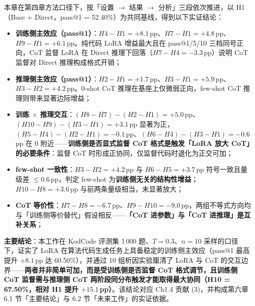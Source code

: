 
本章在第四章方法口径下，按「设置 $\to$ 结果 $\to$ 分析」三段依次推进，以 H1（Base + Direct，pass@1 = 52.40\%）为共同基线，得到以下实证结论：
\begin{itemize}
    \item \textbf{训练侧主效应（pass@1）}：$H4-H1 = +8.1$\,pp、$H7-H1 = +4.8$\,pp、$H9-H1 = +6.1$\,pp。纯代码 LoRA 增益最大且在 pass@1/5/10 三档同号正向，CoT 监督 LoRA 在 Direct 推理下回落（$H7-H4 = -3.3$\,pp）说明 CoT 监督对 Direct 推理构成格式开销；
    \item \textbf{推理侧主效应（pass@1）}：$H2-H1 = +1.7$\,pp、$H3-H1 = +5.9$\,pp、$H3-H2 = +4.2$\,pp。0-shot CoT 推理在基座上仅微弱正向，few-shot CoT 推理则带来显著边际增益；
    \item \textbf{训练 $\times$ 推理交互}：$(H8-H7)-(H2-H1) = +5.0$\,pp、$(H10-H9)-(H3-H1) = +3.1$\,pp 显著为正，$(H5-H4)-(H2-H1) = -0.1$\,pp、$(H6-H4)-(H3-H1) = -0.6$\,pp 在 0 附近——\textbf{训练侧是否显式监督 CoT 格式是触发「LoRA 放大 CoT」的必要条件}：监督 CoT 时形成正协同，仅监督代码时退化为正交可加；
    \item \textbf{few-shot 一致性}：$H3-H2 = +4.2$\,pp 与 $H6-H5 = +3.7$\,pp 符号一致且量级差 $\le 0.6$\,pp，判定 few-shot 为\textbf{训练侧无关的结构性增益}；$H10-H8 = +3.6$\,pp 与前两条量级相当，未显著放大；
    \item \textbf{CoT 等价性}：$H7-H8 = -6.7$\,pp、$H9-H10 = -9.0$\,pp，两组不等式方向均与「训练侧等价替代」假设相反——\textbf{「CoT 进参数」与「CoT 进推理」是互补关系}；
\end{itemize}

\textbf{主要结论}：本工作在 KodCode 评测集 1\,000 题、$T=0.3$、$n=10$ 采样的口径下，证实了 LoRA 在算法代码生成任务上具备稳定的训练侧主效应（pass@1 最高提升 $+8.1$\,pp 达 60.50\%），并通过 10 组析因实验厘清了 LoRA 与 CoT 的交互边界——\textbf{两者并非简单可加，而是受训练侧是否监督 CoT 格式调节，且训练侧 CoT 监督需与推理侧 CoT 两阶段同分布触发才能取得最大协同（H10 = 67.50\%，相对 H1 提升 $+15.1$\,pp）}。该结论对应 Ch1.4 贡献 (3)，并构成第六章 6.1 节「主要结论」与 6.2 节「未来工作」的实证依据。